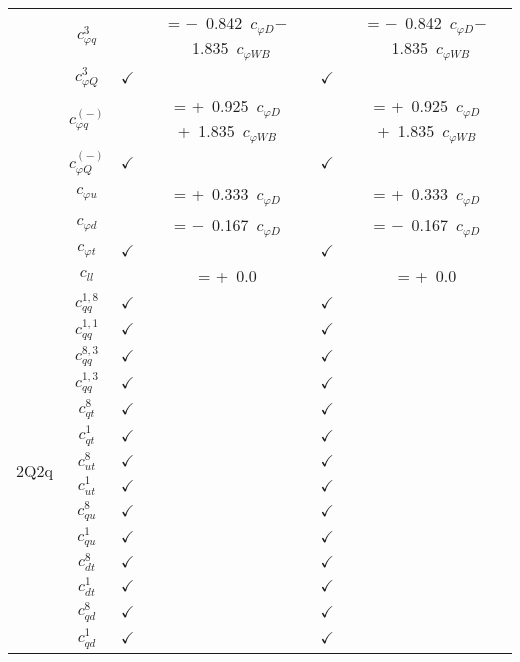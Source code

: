 \documentclass{article}
\begin{document}
\begin{table}[H]
\begin{tabular}{|c|c|c|c|c|c|}
 & $c_{\varphi q}^{3}$ & & = $-$\ 0.842\ $c_{\varphi D}$$-$\ 1.835\ $c_{\varphi WB}$ & & = $-$\ 0.842\ $c_{\varphi D}$$-$\ 1.835\ $c_{\varphi WB}$\\ \cline{2-6}
 & $c_{\varphi Q}^{3}$ & $\checkmark$ &  & $\checkmark$ & \\ \cline{2-6}
 & $c_{\varphi q}^{(-)}$ & & = +\ 0.925\ $c_{\varphi D}$+\ 1.835\ $c_{\varphi WB}$ & & = +\ 0.925\ $c_{\varphi D}$+\ 1.835\ $c_{\varphi WB}$\\ \cline{2-6}
 & $c_{\varphi Q}^{(-)}$ & $\checkmark$ &  & $\checkmark$ & \\ \cline{2-6}
 & $c_{\varphi u}$ & & = +\ 0.333\ $c_{\varphi D}$ & & = +\ 0.333\ $c_{\varphi D}$\\ \cline{2-6}
 & $c_{\varphi d}$ & & = $-$\ 0.167\ $c_{\varphi D}$ & & = $-$\ 0.167\ $c_{\varphi D}$\\ \cline{2-6}
 & $c_{\varphi t}$ & $\checkmark$ &  & $\checkmark$ & \\ \cline{2-6}
 & $c_{ll}$ & & = +\ 0.0 & & = +\ 0.0
\\ \hline
\multirow{14}{*}{2Q2q}
 & $c_{qq}^{1,8}$ & $\checkmark$ &  & $\checkmark$ & \\ \cline{2-6}
 & $c_{qq}^{1,1}$ & $\checkmark$ &  & $\checkmark$ & \\ \cline{2-6}
 & $c_{qq}^{8,3}$ & $\checkmark$ &  & $\checkmark$ & \\ \cline{2-6}
 & $c_{qq}^{1,3}$ & $\checkmark$ &  & $\checkmark$ & \\ \cline{2-6}
 & $c_{qt}^{8}$ & $\checkmark$ &  & $\checkmark$ & \\ \cline{2-6}
 & $c_{qt}^{1}$ & $\checkmark$ &  & $\checkmark$ & \\ \cline{2-6}
 & $c_{ut}^{8}$ & $\checkmark$ &  & $\checkmark$ & \\ \cline{2-6}
 & $c_{ut}^{1}$ & $\checkmark$ &  & $\checkmark$ & \\ \cline{2-6}
 & $c_{qu}^{8}$ & $\checkmark$ &  & $\checkmark$ & \\ \cline{2-6}
 & $c_{qu}^{1}$ & $\checkmark$ &  & $\checkmark$ & \\ \cline{2-6}
 & $c_{dt}^{8}$ & $\checkmark$ &  & $\checkmark$ & \\ \cline{2-6}
 & $c_{dt}^{1}$ & $\checkmark$ &  & $\checkmark$ & \\ \cline{2-6}
 & $c_{qd}^{8}$ & $\checkmark$ &  & $\checkmark$ & \\ \cline{2-6}
 & $c_{qd}^{1}$ & $\checkmark$ &  & $\checkmark$ & 
\\ \hline

\end{tabular}
\end{table}
\end{document}
